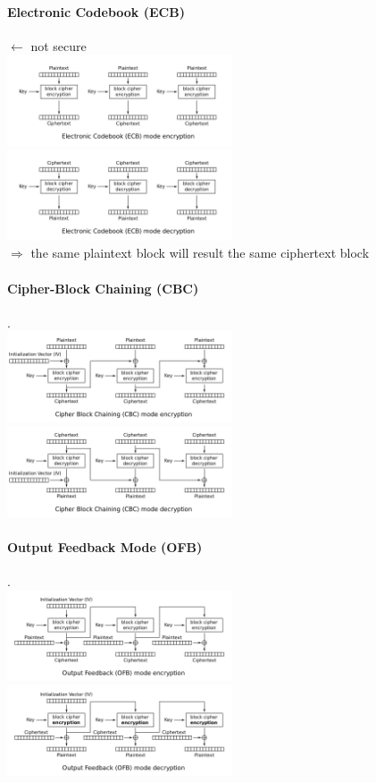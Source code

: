 \documentclass[12pt]{article}
\begin{document}
	\paragraph{Electronic Codebook (ECB)} $\leftarrow$ not secure\\
	\includegraphics[width=0.5\textwidth]{figures/Ecb_encryption.png}
	\includegraphics[width=0.5\textwidth]{figures/Ecb_decryption.png}\\
	$\Rightarrow$ the same plaintext block will result the same ciphertext block
	\paragraph{Cipher-Block Chaining (CBC)} .\\
	\includegraphics[width=0.5\textwidth]{figures/Cbc_encryption.png}
	\includegraphics[width=0.5\textwidth]{figures/Cbc_decryption.png}
	\paragraph{Output Feedback Mode (OFB)} .\\
	\includegraphics[width=0.5\textwidth]{figures/Ofb_encryption.png}
	\includegraphics[width=0.5\textwidth]{figures/Ofb_decryption.png}
\end{document}
